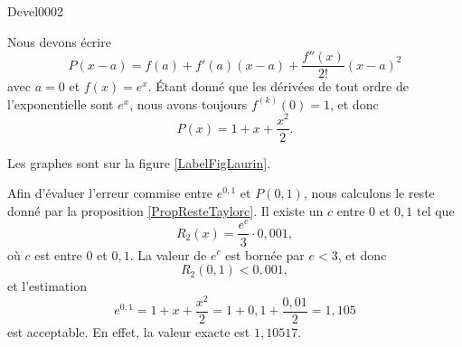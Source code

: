 
\begin{corrige}{Devel0002}


Nous devons écrire
\begin{equation}
	P(x-a)=f(a)+f'(a)(x-a)+\frac{ f''(x) }{ 2! }(x-a)^2
\end{equation}
avec $a=0$ et $f(x)= e^{x}$. Étant donné que les dérivées de tout ordre de l'exponentielle sont $e^x$, nous avons toujours $f^{(k)}(0)=1$, et donc
\begin{equation}
	P(x)=1+x+\frac{ x^2 }{ 2 }.
\end{equation}

Les graphes sont sur la figure \ref{LabelFigLaurin}.
\newcommand{\CaptionFigLaurin}{En bleu : la fonction $x\mapsto e^x$, en vert son développement d'ordre $1$ et en rouge celui d'ordre $2$.}


Afin d'évaluer l'erreur commise entre $e^{0,1}$ et $P(0,1)$, nous calculons le reste donné par la proposition \ref{PropResteTaylorc}. Il existe un $c$ entre $0$ et $0,1$ tel que
\begin{equation}
	R_2(x)=\frac{ e^c }{ 3 }\cdot 0,001,
\end{equation}
où $c$ est entre $0$ et $0,1$. La valeur de $e^c$ est bornée par $e<3$, et donc
\begin{equation}
	R_2(0,1)<0,001,
\end{equation}
et l'estimation
\begin{equation}
	e^{0,1}=1+x+\frac{ x^2 }{ 2 }=1+0,1+\frac{ 0,01 }{ 2 }=1,105
\end{equation}
est acceptable. En effet, la valeur \og exacte\fg{} est $1,10517$.

\end{corrige}
